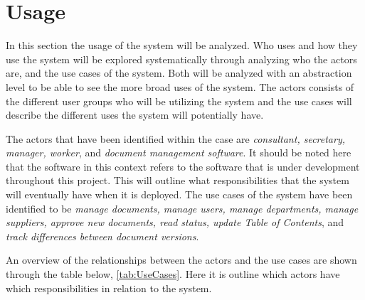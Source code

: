 \section{Usage}\label{sec:Usage}

In this section the usage of the system will be analyzed. 
Who uses and how they use the system will be explored systematically through analyzing who the actors are, and the use cases of the system.
Both will be analyzed with an abstraction level to be able to see the more broad uses of the system.
The actors consists of the different user groups who will be utilizing the system and the use cases will describe the different uses the system will potentially have.

The actors that have been identified within the case are \textit{consultant, secretary, manager, worker}, and \textit{document management software}.
It should be noted here that the software in this context refers to the software that is under development throughout this project.
This will outline what responsibilities that the system will eventually have when it is deployed.
The use cases of the system have been identified to be \textit{manage documents, manage users, manage departments, manage suppliers, approve new documents, read status, update Table of Contents}, and \textit{track differences between document versions}.

An overview of the relationships between the actors and the use cases are shown through the table below, \cref{tab:UseCases}. Here it is outline which actors have which responsibilities in relation to the system.

